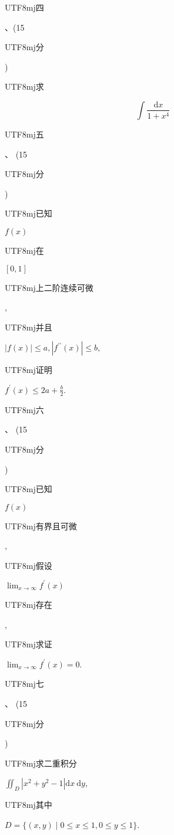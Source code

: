 \documentclass[10pt]{article}
\begin{document}
\begin{CJK}{UTF8}{mj}四\end{CJK}、(15 \begin{CJK}{UTF8}{mj}分\end{CJK}) \begin{CJK}{UTF8}{mj}求\end{CJK}
$$
\int \frac{\mathrm{d} x}{1+x^{4}}
$$
\begin{CJK}{UTF8}{mj}五\end{CJK}、 (15 \begin{CJK}{UTF8}{mj}分\end{CJK}) \begin{CJK}{UTF8}{mj}已知\end{CJK} $f(x)$ \begin{CJK}{UTF8}{mj}在\end{CJK} $[0,1]$ \begin{CJK}{UTF8}{mj}上二阶连续可微\end{CJK}, \begin{CJK}{UTF8}{mj}并且\end{CJK} $|f(x)| \leq a,\left|f^{\prime \prime}(x)\right| \leq b$, \begin{CJK}{UTF8}{mj}证明\end{CJK} $f^{\prime}(x) \leq 2 a+\frac{b}{2}$.

\begin{CJK}{UTF8}{mj}六\end{CJK}、 (15 \begin{CJK}{UTF8}{mj}分\end{CJK}) \begin{CJK}{UTF8}{mj}已知\end{CJK} $f(x)$ \begin{CJK}{UTF8}{mj}有界且可微\end{CJK}, \begin{CJK}{UTF8}{mj}假设\end{CJK} $\lim _{x \rightarrow \infty} f^{\prime}(x)$ \begin{CJK}{UTF8}{mj}存在\end{CJK}, \begin{CJK}{UTF8}{mj}求证\end{CJK} $\lim _{x \rightarrow \infty} f^{\prime}(x)=0$.

\begin{CJK}{UTF8}{mj}七\end{CJK}、 (15 \begin{CJK}{UTF8}{mj}分\end{CJK}) \begin{CJK}{UTF8}{mj}求二重积分\end{CJK} $\iint_{D}\left|x^{2}+y^{2}-1\right| \mathrm{d} x \mathrm{~d} y$, \begin{CJK}{UTF8}{mj}其中\end{CJK} $D=\{(x, y) \mid 0 \leq x \leq 1,0 \leq y \leq 1\}$.
\end{document}

